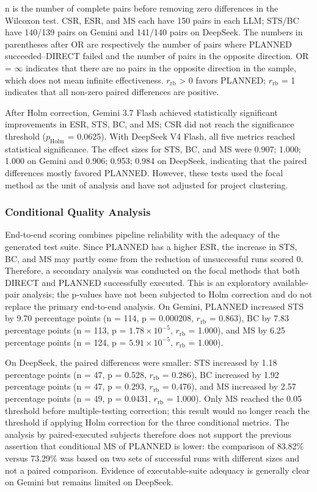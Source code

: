\documentclass[pdflatex,sn-basic,Numbered,iicol]{sn-jnl}
\begin{document}
n is the number of complete pairs before removing zero differences in the Wilcoxon test. CSR, ESR, and MS each have 150 pairs in each LLM; STS/BC have 140/139 pairs on Gemini and 141/140 pairs on DeepSeek. The numbers in parentheses after OR are respectively the number of pairs where PLANNED succeeded--DIRECT failed and the number of pairs in the opposite direction. OR = \ensuremath{\infty} indicates that there are no pairs in the opposite direction in the sample, which does not mean infinite effectiveness. $r_{\mathrm{rb}}$ > 0 favors PLANNED; $r_{\mathrm{rb}}$ = 1 indicates that all non-zero paired differences are positive.

After Holm correction, Gemini 3.7 Flash achieved statistically significant improvements in ESR, STS, BC, and MS; CSR did not reach the significance threshold ($p_{\mathrm{Holm}}$ = 0.0625). With DeepSeek V4 Flash, all five metrics reached statistical significance. The effect sizes for STS, BC, and MS were 0.907; 1.000; 1.000 on Gemini and 0.906; 0.953; 0.984 on DeepSeek, indicating that the paired differences mostly favored PLANNED. However, these tests used the focal method as the unit of analysis and have not adjusted for project clustering.

\subsubsection{Conditional Quality Analysis}\label{subsubsec:rq1-conditional}

End-to-end scoring combines pipeline reliability with the adequacy of the generated test suite. Since PLANNED has a higher ESR, the increase in STS, BC, and MS may partly come from the reduction of unsuccessful runs scored 0. Therefore, a secondary analysis was conducted on the focal methods that both DIRECT and PLANNED successfully executed. This is an exploratory available-pair analysis; the p-values have not been subjected to Holm correction and do not replace the primary end-to-end analysis. On Gemini, PLANNED increased STS by 9.70 percentage points (n = 114, p = 0.000208, $r_{\mathrm{rb}}$ = 0.863), BC by 7.83 percentage points (n = 113, p = $1.78\times 10^{-5}$, $r_{\mathrm{rb}}$ = 1.000), and MS by 6.25 percentage points (n = 124, p = $5.91\times 10^{-5}$, $r_{\mathrm{rb}}$ = 1.000).

On DeepSeek, the paired differences were smaller: STS increased by 1.18 percentage points (n = 47, p = 0.528, $r_{\mathrm{rb}}$ = 0.286), BC increased by 1.92 percentage points (n = 47, p = 0.293, $r_{\mathrm{rb}}$ = 0.476), and MS increased by 2.57 percentage points (n = 49, p = 0.0431, $r_{\mathrm{rb}}$ = 1.000). Only MS reached the 0.05 threshold before multiple-testing correction; this result would no longer reach the threshold if applying Holm correction for the three conditional metrics. The analysis by paired-executed subjects therefore does not support the previous assertion that conditional MS of PLANNED is lower: the comparison of 83.82\% versus 73.29\% was based on two sets of successful runs with different sizes and not a paired comparison. Evidence of executable-suite adequacy is generally clear on Gemini but remains limited on DeepSeek.
\end{document}
